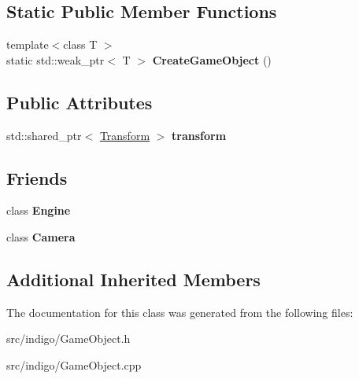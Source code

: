 \subsection*{Static Public Member Functions}
\begin{DoxyCompactItemize}
\item 
\mbox{\label{class_indigo_1_1_game_object_ac6c3b74cc503f36f7b834f395fd2f2e2}} 
{\footnotesize template$<$class T $>$ }\\static std\+::weak\+\_\+ptr$<$ T $>$ {\bfseries Create\+Game\+Object} ()
\end{DoxyCompactItemize}
\subsection*{Public Attributes}
\begin{DoxyCompactItemize}
\item 
\mbox{\label{class_indigo_1_1_game_object_a807115c579b93b60fbf69a85ac31a65c}} 
std\+::shared\+\_\+ptr$<$ \hyperlink{class_indigo_1_1_transform}{Transform} $>$ {\bfseries transform}
\end{DoxyCompactItemize}
\subsection*{Friends}
\begin{DoxyCompactItemize}
\item 
\mbox{\label{class_indigo_1_1_game_object_a3e1914489e4bed4f9f23cdeab34a43dc}} 
class {\bfseries Engine}
\item 
\mbox{\label{class_indigo_1_1_game_object_ad8bd9afbbd7af19d996da80e9d25890d}} 
class {\bfseries Camera}
\end{DoxyCompactItemize}
\subsection*{Additional Inherited Members}


The documentation for this class was generated from the following files\+:\begin{DoxyCompactItemize}
\item 
src/indigo/Game\+Object.\+h\item 
src/indigo/Game\+Object.\+cpp\end{DoxyCompactItemize}
